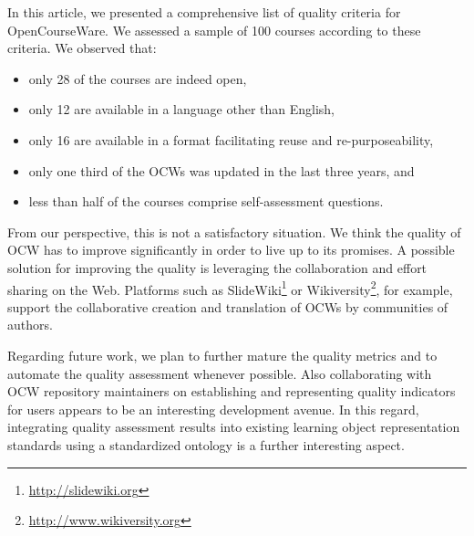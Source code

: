 \documentclass{sig-alternate}
\theoremstyle{definition}
\begin{document}
In this article, we presented a comprehensive list of quality criteria for OpenCourseWare.
We assessed a sample of 100 courses according to these criteria.
We observed that:
\begin{itemize}
\item only 28 of the courses are indeed open,
\item only 12 are available in a language other than English,
\item only 16 are available in a format facilitating reuse and re-purposeability,
\item only one third of the OCWs was updated in the last three years, and
\item less than half of the courses comprise self-assessment questions.
\end{itemize}
From our perspective, this is not a satisfactory situation.
We think the quality of OCW has to improve significantly in order to live up to its promises.
A possible solution for improving the quality is leveraging the collaboration and effort sharing on the Web.
Platforms such as SlideWiki\footnote{\url{http://slidewiki.org}} or Wikiversity\footnote{\url{http://www.wikiversity.org}}, for example, support the collaborative creation and translation of OCWs by communities of authors.

Regarding future work, we plan to further mature the quality metrics and to automate the quality assessment whenever possible.
Also collaborating with OCW repository maintainers on establishing and representing quality indicators for users appears to be an interesting development avenue.
In this regard, integrating quality assessment results into existing learning object representation standards using a standardized ontology is a further interesting aspect.

\printbibliography
\iflak
\balancecolumns

\fi
\end{document}
